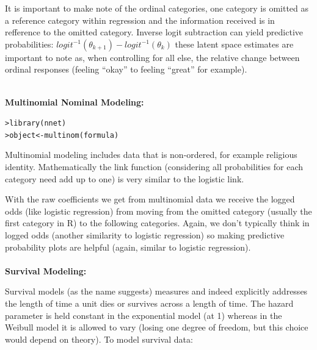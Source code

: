 \documentclass[12pt]{article}\usepackage[]{graphicx}\usepackage[]{color}
\makeatletter
\newcommand{\hlstd}[1]{\textcolor[rgb]{0.882,0.878,0.898}{#1}}%
\newcommand{\hlkwb}[1]{\textcolor[rgb]{0.902,0.675,0.196}{#1}}%
\newcommand{\hlkwd}[1]{\textcolor[rgb]{0.733,0.388,0.812}{#1}}%
\newenvironment{kframe}{%
 \def\at@end@of@kframe{}%
 \ifinner\ifhmode%
  \def\at@end@of@kframe{\end{minipage}}%
  \begin{minipage}{\columnwidth}%
 \fi\fi%
 \def\FrameCommand##1{\hskip\@totalleftmargin \hskip-\fboxsep
 \colorbox{shadecolor}{##1}\hskip-\fboxsep
     \hskip-\linewidth \hskip-\@totalleftmargin \hskip\columnwidth}%
 \MakeFramed {\advance\hsize-\width
   \@totalleftmargin\z@ \linewidth\hsize
   \@setminipage}}%
 {\par\unskip\endMakeFramed%
 \at@end@of@kframe}
\newenvironment{knitrout}{}{} %
\makeatother
\begin{document}
\begin{flushleft}
It is important to make note of the ordinal categories, one category is omitted as a reference category within regression and the information received is in refference to the omitted category. Inverse logit subtraction can yield predictive probabilities: $logit^{-1}(\theta_{k+1}) - logit^{-1}(\theta_k) $ these latent space estimates are important to note as, when controlling for all else, the relative change between ordinal responses (feeling ``okay'' to feeling ``great'' for example).

\hfill \\




\noindent \textbf{Multinomial Nominal Modeling:}

\begin{knitrout}
\color{fgcolor}\begin{kframe}
\begin{alltt}
\hlstd{> }\hlkwd{library}\hlstd{(nnet)}
\hlstd{> }\hlstd{object} \hlkwb{<-} \hlkwd{multinom}\hlstd{(formula)}
\end{alltt}
\end{kframe}
\end{knitrout}


Multinomial modeling includes data that is non-ordered, for example religious identity. Mathematically the link function (considering all probabilities for each category need add up to one) is very similar to the logistic link.

With the raw coefficients we get from multinomial data we receive the logged odds (like logistic regression) from moving from the omitted category (usually the first category in R) to the following categories. Again, we don't typically think in logged odds (another similarity to logistic regression) so making predictive probability plots are helpful (again, similar to logistic regression). \\


\hfill \\
\noindent \textbf{Survival Modeling: }

Survival models (as the name suggests) measures and indeed explicitly addresses the length of time a unit dies or survives across a length of time. The hazard parameter is held constant in the exponential model (at 1) whereas in the Weibull model it is allowed to vary (losing one degree of freedom, but this choice would depend on theory). To model survival data:


\end{flushleft}
\end{document}
